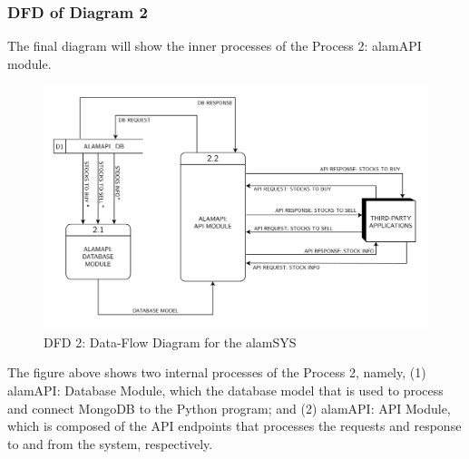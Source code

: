 \subsubsection{DFD of Diagram 2}
\label{subsubsec:dfd2}
The final diagram will show the inner processes of 
the Process 2: alamAPI module.
\begin{figure}[ht]
    \centering
    \includegraphics[width=1\textwidth]{./assets/Data Flow Diagram-04.png}
    \caption{DFD 2: Data-Flow Diagram for the alamSYS}
    \label{fig:dfd2}
\end{figure}
\FloatBarrier
\vspace{0.5cm}
The figure above shows two internal processes of the Process 2, namely, 
(1) alamAPI: Database Module, which the database model that is used to process and 
connect MongoDB to the Python program; and 
(2) alamAPI: API Module, which is composed of the API endpoints that processes 
the requests and response to and from the system, respectively.